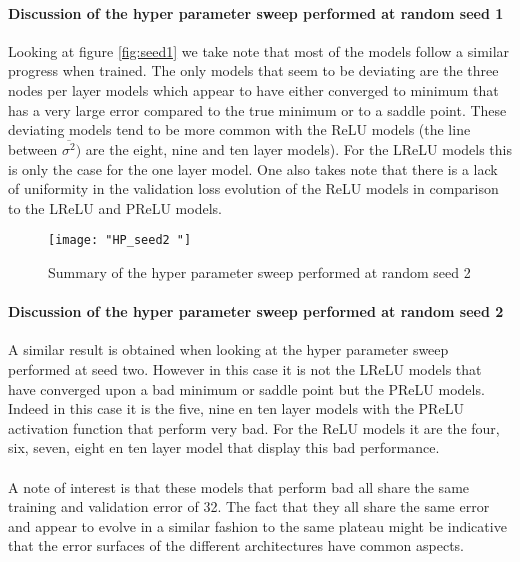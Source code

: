 \documentclass[12pt]{article}
\begin{document}
\paragraph{Discussion of the hyper parameter sweep performed at  random seed 1}
Looking at figure \ref{fig:seed1} we take note that most of the models follow a similar progress when trained. The only models that seem to be deviating are the three nodes per layer models which appear to have either converged to minimum that has a very large error compared to the true minimum  or to a saddle point. These deviating models tend to be more common with the ReLU models (the line between $\overline{\sigma^2})$ are the eight, nine and ten layer models). For the LReLU models this is only the case for the one layer model. One also takes note that there is a lack of uniformity in the validation loss evolution of the ReLU models in comparison to the LReLU and PReLU models.

\begin{figure}[H]
	\centering
	\texttt{[image: "HP\_seed2 "]}
	\caption{Summary of the hyper parameter sweep performed at random seed 2}
	\label{fig:seed2}
\end{figure}

\paragraph{Discussion of the hyper parameter sweep performed at random seed 2}
A similar result is obtained when looking at the hyper parameter sweep performed at seed two. However in this case it is not the LReLU models that have converged upon a bad minimum or saddle point but the PReLU models. Indeed in this case it is the five, nine en ten layer models with the PReLU activation function that perform very bad. For the ReLU models it are the four, six, seven, eight en ten layer model that display this bad performance.
\\
\\
A note of interest is that these models that perform bad all share the same training and validation error of 32. The fact that they all share the same error and appear to evolve in a similar fashion to the same plateau might be indicative that the error surfaces of the different architectures have common aspects.
\end{document}
